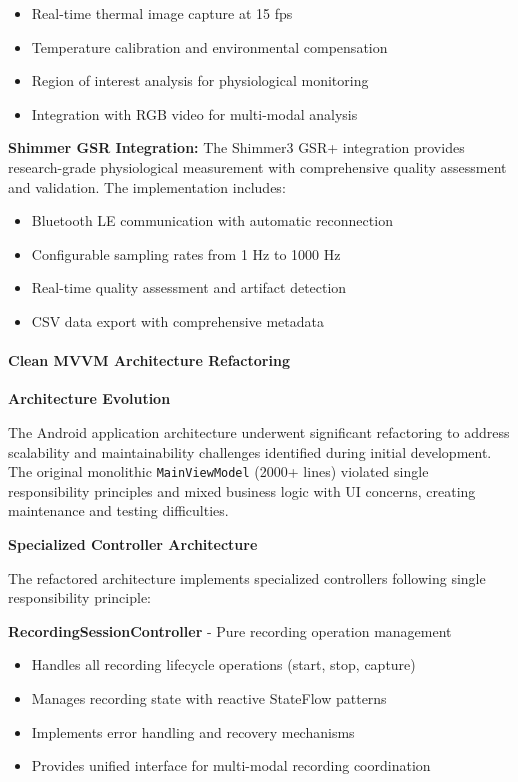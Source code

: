 \documentclass[12pt,a4paper]{report}
\begin{document}
\begin{itemize}
\item Real-time thermal image capture at 15 fps
\item Temperature calibration and environmental compensation
\item Region of interest analysis for physiological monitoring
\item Integration with RGB video for multi-modal analysis

\end{itemize}
\textbf{Shimmer GSR Integration:}
The Shimmer3 GSR+ integration provides research-grade physiological measurement with comprehensive quality assessment
and validation. The implementation includes:

\begin{itemize}
\item Bluetooth LE communication with automatic reconnection
\item Configurable sampling rates from 1 Hz to 1000 Hz
\item Real-time quality assessment and artifact detection
\item CSV data export with comprehensive metadata

\end{itemize}

\paragraph{Clean MVVM Architecture Refactoring}

\textbf{Architecture Evolution}

The Android application architecture underwent significant refactoring to address scalability and maintainability challenges identified during initial development. The original monolithic \texttt{MainViewModel} (2000+ lines) violated single responsibility principles and mixed business logic with UI concerns, creating maintenance and testing difficulties.

\textbf{Specialized Controller Architecture}

The refactored architecture implements specialized controllers following single responsibility principle:

\textbf{RecordingSessionController} - Pure recording operation management
\begin{itemize}
\item Handles all recording lifecycle operations (start, stop, capture)
\item Manages recording state with reactive StateFlow patterns
\item Implements error handling and recovery mechanisms
\item Provides unified interface for multi-modal recording coordination
\end{itemize}
\end{document}
